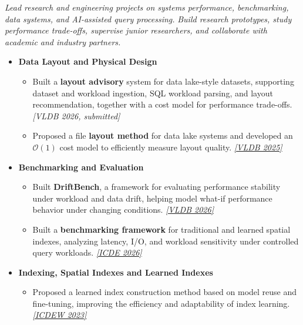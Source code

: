 \documentclass{resume}
\begin{document}
\textit{Lead research and engineering projects on systems performance, benchmarking, data systems, and AI-assisted query processing.}
\textit{Build research prototypes, study performance trade-offs, supervise junior researchers, and collaborate with academic and industry partners.}

\begin{itemize}[parsep=0.4ex]


\item \textbf{Data Layout and Physical Design}
\begin{itemize}[parsep=0.3ex]
    \item Built a \textbf{layout advisory} system for data lake-style datasets, supporting dataset and workload ingestion, SQL workload parsing, and layout recommendation, together with a cost model for performance trade-offs.
    \href{https://github.com/Liuguanli/layout_advisor}{\faGithub}
    \textit{[VLDB 2026, submitted]}

    \item Proposed a file \textbf{layout method} for data lake systems and developed an \(\mathcal{O}(1)\) cost model to efficiently measure layout quality.
    \href{https://github.com/Liuguanli/LBMC}{\faGithub}
    \href{https://www.vldb.org/pvldb/vol17/p4773-liu.pdf}{\textit{[VLDB 2025\faExternalLink]}}
\end{itemize}

\item \textbf{Benchmarking and Evaluation}
\begin{itemize}[parsep=0.3ex]
    \item Built \textbf{DriftBench}, a framework for evaluating performance stability under workload and data drift, helping model what-if performance behavior under changing conditions.
    \href{https://github.com/Liuguanli/DriftBench}{\faGithub}
    \href{https://arxiv.org/abs/2510.10858}{\textit{[VLDB 2026\faExternalLink]}}
    \item Built a \textbf{benchmarking framework} for traditional and learned spatial indexes, analyzing latency, I/O, and workload sensitivity under controlled query workloads. \href{https://github.com/Liuguanli/rl_spatial_benchmark}{\faGithub}
\href{https://arxiv.org/abs/2512.11161}{\textit{[ICDE 2026\faExternalLink]}}
\end{itemize}

\item \textbf{Indexing, Spatial Indexes and Learned Indexes}
\begin{itemize}[parsep=0.3ex]
    \item Proposed a learned index construction method based on model reuse and fine-tuning, improving the efficiency and adaptability of index learning.
\href{https://people.eng.unimelb.edu.au/jianzhongq/papers/DBML2023_ModelReuse.pdf}{\textit{[ICDEW 2023\faExternalLink]}}


\end{itemize}
\end{itemize}
\end{document}
